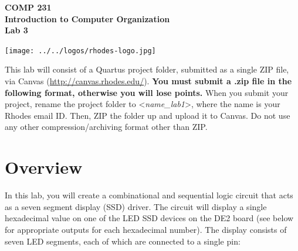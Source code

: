 \documentclass[10pt]{article}
\begin{document}

\hspace{-5mm}
\begin{minipage}{0.65\linewidth}
  \textbf{{\Large COMP 231\\
      Introduction to Computer Organization\\Lab 3}}
\end{minipage}
\begin{minipage}{0.35\linewidth}
  \texttt{[image: ../../logos/rhodes-logo.jpg]}
\end{minipage}

\vspace{.25in}

This lab will consist of a Quartus project folder, submitted as a
single ZIP file, via Canvas (\url{http://canvas.rhodes.edu/}).
{\bf You must submit a .zip file in the following format, otherwise
  you will lose points.} When you submit your project, rename the
project folder to <{\em name\_lab1}>, where the name is your Rhodes
email ID. Then, ZIP the folder up and upload it to Canvas. Do not
use any other compression/archiving format other than ZIP.

\section*{Overview}

In this lab, you will create a combinational and sequential logic
circuit that acts as a seven segment display (SSD) driver. The
circuit will display a single hexadecimal value on one of the LED SSD
devices on the DE2 board (see below for appropriate outputs for each hexadecimal number). The display consists of seven LED segments,
each of which are connected to a single pin:
\end{document}
